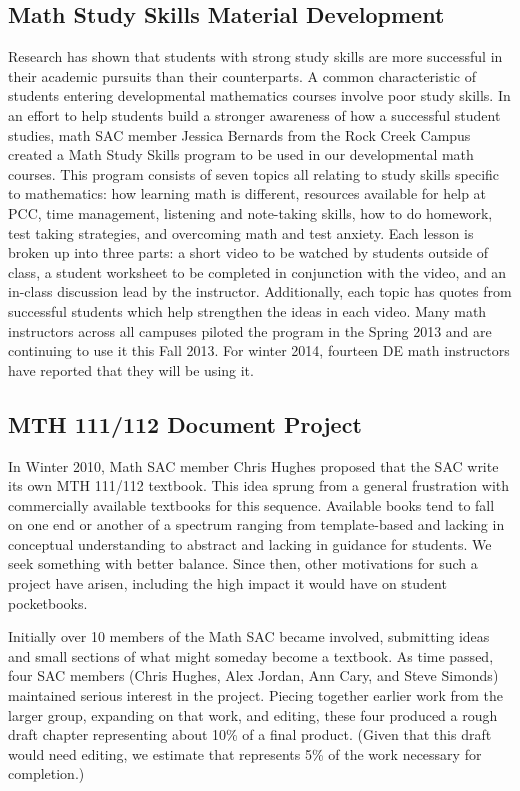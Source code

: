\subsection{Math Study Skills Material Development}
Research has shown that students with strong study skills are more successful in their academic pursuits than their counterparts.  A common characteristic of students entering developmental mathematics courses involve poor study skills.  In an effort to help students build a stronger awareness of how a successful student studies, math SAC member Jessica Bernards from the Rock Creek Campus created a Math Study Skills program to be used in our developmental math courses.  This program consists of seven topics all relating to study skills specific to mathematics: how learning math is different, resources available for help at PCC, time management, listening and note-taking skills, how to do homework, test taking strategies, and overcoming math and test anxiety.  Each lesson is broken up into three parts: a short video to be watched by students outside of class, a student worksheet to be completed in conjunction with the video, and an in-class discussion lead by the instructor. Additionally, each topic has quotes from successful students which help strengthen the ideas in each video.  Many math instructors across all campuses piloted the program in the Spring 2013 and are continuing to use it this Fall 2013. For winter 2014, fourteen DE math instructors have reported that they will be using it.
 
\subsection{MTH 111/112 Document Project}\label{cur:sec:111/112doc}
In Winter 2010, Math SAC member Chris Hughes proposed that the SAC write its own MTH 111/112 textbook. This idea sprung from a general frustration with commercially available textbooks for this sequence.  Available books tend to fall on one end or another of a spectrum ranging from template-based and lacking in conceptual understanding to abstract and lacking in guidance for students.  We seek something with better balance.  Since then, other motivations for such a project have arisen, including the high impact it would have on student pocketbooks.

Initially over 10 members of the Math SAC became involved, submitting ideas and small sections of what might someday become a textbook.  As time passed, four SAC members (Chris Hughes, Alex Jordan, Ann Cary, and Steve Simonds) maintained serious interest in the project.  Piecing together earlier work from the larger group, expanding on that work, and editing, these four produced a rough draft chapter representing about 10\% of a final product. (Given that this draft would need editing, we estimate that represents 5\% of the work necessary for completion.)

